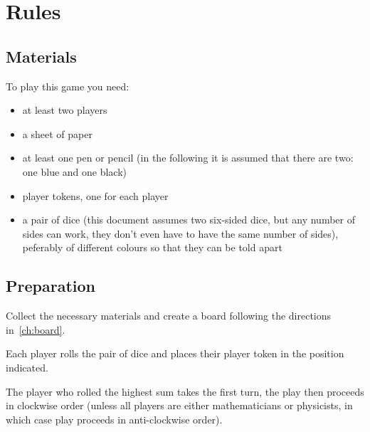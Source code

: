 
\section{Rules}

\subsection{Materials}
To play this game you need:
\begin{itemize}
    \item at least two players
    \item a sheet of paper
    \item at least one pen or pencil (in the following it is assumed that there
        are two: one blue and one black)
    \item player tokens, one for each player
    \item a pair of dice (this document assumes two six-sided dice, but any
        number of sides can work, they don't even have to have the same number
        of sides), peferably of different colours so that they can be told
        apart
\end{itemize}

\subsection{Preparation}
Collect the necessary materials and create a board following the directions
in~\ref{ch:board}.

Each player rolls the pair of dice and places their player token in the
position indicated.

The player who rolled the highest sum takes the first turn, the play then
proceeds in clockwise order (unless all players are either mathematicians or
physicists, in which case play proceeds in anti-clockwise order).

